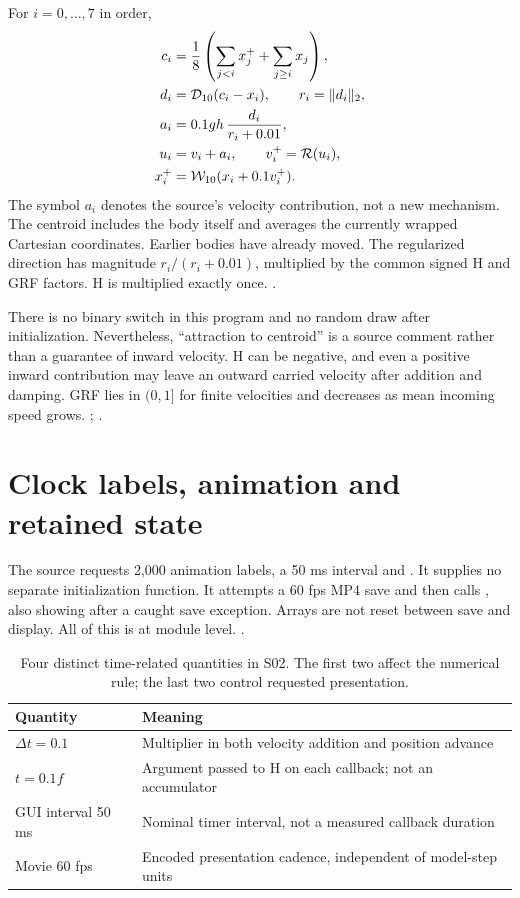 For $i=0,\ldots,7$ in order,
\begin{align}
c_i&=\frac18\left(\sum_{j<i}x_j^++\sum_{j\ge i}x_j\right),\label{eq:centroid}\\
d_i&=\mathcal D_{10}(c_i-x_i),\qquad r_i=\|d_i\|_2,\label{eq:centroiddiff}\\
a_i&=0.1gh\,\frac{d_i}{r_i+0.01},\label{eq:kick02}\\
u_i&=v_i+a_i,\qquad v_i^+=\mathcal R(u_i),\label{eq:vel02}\\
x_i^+&=\mathcal W_{10}(x_i+0.1v_i^+).\label{eq:pos02}
\end{align}
The symbol $a_i$ denotes the source's velocity contribution, not a new
mechanism. The centroid includes the body itself and averages the
currently wrapped Cartesian coordinates. Earlier bodies have already
moved. The regularized direction has magnitude $r_i/(r_i+0.01)$,
multiplied by the common signed H and GRF factors. H is multiplied
exactly once. . 

There is no binary switch in this program and no random draw after
initialization. Nevertheless, “attraction to centroid” is a source
comment rather than a guarantee of inward velocity. H can be negative,
and even a positive inward contribution may leave an outward carried
velocity after addition and damping. GRF lies in $(0,1]$ for finite
velocities and decreases as mean incoming speed grows.
; \cite{construction02}. 

\section{Clock labels, animation and retained state}
The source requests 2,000 animation labels, a 50 ms interval and
. It supplies no separate initialization function.
It attempts a 60 fps MP4 save and then calls ,
also showing after a caught save exception. Arrays are not reset between
save and display. All of this is at module level.
. 

\begin{table}[htbp]\centering\small
\caption{Four distinct time-related quantities in S02. The first two affect
the numerical rule; the last two control requested presentation.}\label{tab:clocks02}
\begin{tabularx}{\linewidth}{@{}l Y@{}}\toprule
Quantity & Meaning\\\midrule
$\Delta t=0.1$ & Multiplier in both velocity addition and position advance\\
$t=0.1f$ & Argument passed to H on each callback; not an accumulator\\
GUI interval 50 ms & Nominal timer interval, not a measured callback duration\\
Movie 60 fps & Encoded presentation cadence, independent of model-step units\\\bottomrule
\end{tabularx}
\end{table}

